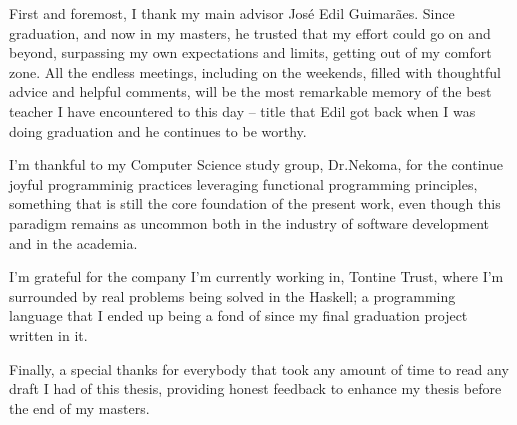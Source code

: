 First and foremost, I thank my main advisor José Edil Guimarães.
Since graduation, and now in my masters, he trusted that my effort could go on and beyond, surpassing my own expectations
and limits, getting out of my comfort zone. All the endless meetings, including on the weekends, filled with thoughtful advice and helpful comments,
will be the most remarkable memory of the best teacher I have encountered to this day -- title that Edil got back when I was doing graduation and he
continues to be worthy.

I'm thankful to my Computer Science study group, Dr.Nekoma, for the continue joyful programminig practices leveraging functional programming principles, something that is
still the core foundation of the present work, even though this paradigm remains as uncommon both in the industry of software development and in the academia.

I'm grateful for the company I'm currently working in, Tontine Trust, where I'm surrounded by real problems being solved in the Haskell; a programming language
that I ended up being a fond of since my final graduation project written in it.

Finally, a special thanks for everybody that took any amount of time to read any draft I had of this thesis, providing honest feedback to enhance my thesis
before the end of my masters. 
